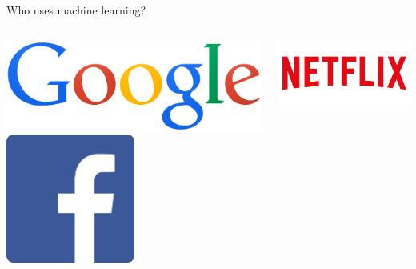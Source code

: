 \documentclass[pdf]{beamer}
\begin{document}
\begin{frame}{Who uses machine learning?}
\begin{columns}
\begin{center}
	\includegraphics[width=\textwidth]{google.png}
	\vspace{2cm}
	\includegraphics[width=0.5\textwidth]{facebook.png}
\end{center}
\begin{center}
	\includegraphics[width=\textwidth]{netflix.png}\\

\end{center}
\end{columns}
\end{frame}
\end{document}
